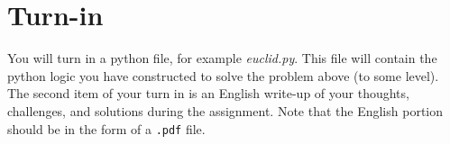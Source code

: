 \documentclass[12pt]{article}
\begin{document}
	\section{Turn-in}
		\indent You will turn in a python file,
			for example \textit{euclid.py}.
		This file will contain the python logic you have constructed to solve the problem above (to some level).
		The second item of your turn in is an English write-up of your thoughts, challenges, and solutions during the assignment.
		Note that the English portion should be in the form of a \verb|.pdf| file.


	\nocite{*}

	\newpage %
	\backmatter
	\printbibliography
\end{document}
